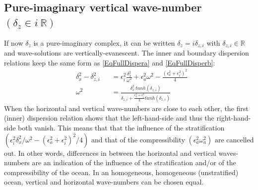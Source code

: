 \documentclass[a4paper,11pt]{article}
\begin{document}
\subsection{Pure-imaginary vertical wave-number $(\delta_z\in i\ 
\mathbb{R})$}
\label{subsubsectioniR}

If now $\delta_z$ is a pure-imaginary complex, it can be written $\delta_z=i\delta_{z,i}$ with $\delta_{z,i}\in\mathbb{R}$ and wave-solutions are vertically-evanescent. The inner and boundary dispersion relations keep the same form as \ref{EqFullDispera} and \ref{EqFullDisperb}:
\begin{subequations}
	\label{EqFullDisperi}
	\begin{alignat}{2}	
		\label{EqFullDisperai}
 		& \delta_x^2-\delta_{z,i}^2 &&=\epsilon_i^2\frac{\delta_x^2}
 			{\omega^2}+\epsilon_a^2\omega^2-\frac{(\epsilon_a^2+\epsilon_i^2)^2}{4}\\[3mm]
		\label{EqFullDisperbi}
		& \omega^2 &&=\frac{\delta_x^2\ tanh(\delta_{z,i})}
		{\delta_{z,i}+\frac{\epsilon_a^2+\epsilon_i^2}			{2}tanh(\delta_{z,i})}
	\end{alignat}
\end{subequations}
When the horizontal and vertical wave-numbers are close to each other, the first (inner) dispersion relation shows that the left-hand-side and thus the right-hand-side both vanish. This means that that the influence of the stratification $(\epsilon_i^2\delta_x^2/\omega^2-(\epsilon_a^2+\epsilon_i^2)^2/4)$ and that of the compressibility $(\epsilon_a^2\omega_a^2)$ are cancelled out. In other words, differences in between the horizontal and vertical waves-numbers are an indication of the influence of the stratification and/or of the compressibility of the ocean. In an homogeneous, homogeneous (unstratified) ocean, vertical and horizontal wave-numbers can be chosen equal.\\
\end{document}
